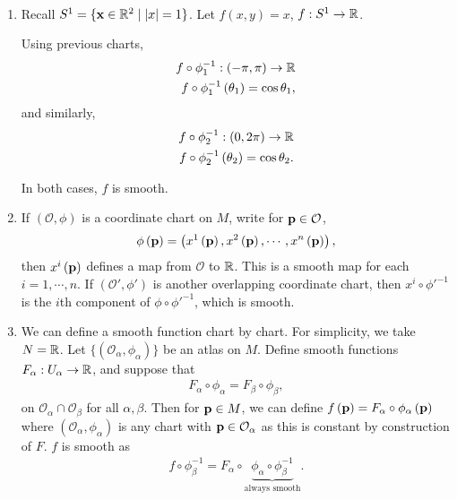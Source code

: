 \begin{examples}~
    \begin{enumerate}[label=\arabic*)]
        \item Recall $S^{1} = \{\vb{x} \in \mathbb{R}^2  \mid  \left| x \right| = 1\} $. Let $f\left( x,y \right) = x$, $f : S^{1} \to \mathbb{R}$.

            Using previous charts,
            \begin{align}
                f \circ \phi_1^{-1} : \left( -\pi, \pi \right) \to \mathbb{R} \\
                f \circ \phi^{-1}_1\left( \theta_1 \right) = \cos \theta_1
            ,\end{align}
            and similarly,
            \begin{align}
                f \circ \phi_2^{-1} : \left( 0, 2\pi \right) \to \mathbb{R} \\
                f \circ \phi_2^{-1} \left( \theta_2 \right) = \cos \theta_2
            .\end{align}

            In both cases, $f$ is smooth.

        \item If $\left( \mathcal{O}, \phi \right) $ is a coordinate chart on $M$, write for $\vb{p} \in \mathcal{O}$,
            \begin{align}
                \phi \left( \vb{p} \right) = \left( x^{1}\left( \vb{p} \right), x^{2}\left( \vb{p} \right) , \cdots, x^{n}\left( \vb{p} \right)   \right) 
            ,\end{align}
            then $x^{i}\left( \vb{p} \right) $ defines a map from $\mathcal{O}$ to $\mathbb{R}$. This is a smooth map for each $i = 1, \cdots, n$. If $\left( \mathcal{O}', \phi' \right) $ is another overlapping coordinate chart, then $x^{i} \circ \phi'^{-1}$ is the $i$th component of $\phi \circ \phi'^{-1}$, which is smooth.

        \item We can define a smooth function chart by chart. For simplicity, we take $N = \mathbb{R}$. Let $\{\left( \mathcal{O}_\alpha, \phi_\alpha \right) \} $ be an atlas on $M$. Define smooth functions $F_{\alpha} : U_{\alpha} \to \mathbb{R}$, and suppose that
            \begin{align}
                F_{\alpha} \circ \phi_{\alpha} = F_{\beta} \circ \phi_{\beta}
            ,\end{align}
            on $\mathcal{O}_\alpha \cap \mathcal{O}_{\beta}$ for all $\alpha, \beta$. Then for $\vb{p} \in M$, we can define $f\left( \vb{p} \right) = F_{\alpha} \circ \phi_{\alpha}\left( \vb{p} \right) $ where $\left( \mathcal{O}_{\alpha}, \phi_{\alpha} \right) $ is any chart with $\vb{p} \in \mathcal{O}_{\alpha}$ as this is constant by construction of $F$. $f$ is smooth as
            \begin{align}
                f \circ \phi_\beta^{-1} = F_\alpha \circ \underbrace{\phi_\alpha \circ \phi_\beta^{-1}}_{\text{always smooth}}
            .\end{align}


\end{enumerate}
\end{examples}
